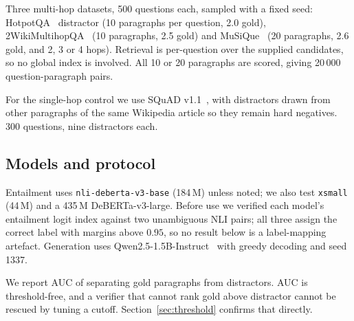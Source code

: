 \documentclass[conference]{IEEEtran}
\begin{document}
Three multi-hop datasets, 500 questions each, sampled with a fixed seed:
HotpotQA~\cite{yang2018hotpotqa} distractor (10 paragraphs per question, 2.0
gold), 2WikiMultihopQA~\cite{ho20202wiki} (10 paragraphs, 2.5 gold) and
MuSiQue~\cite{trivedi2022musique} (20 paragraphs, 2.6 gold, and 2, 3 or 4 hops).
Retrieval is per-question over the supplied candidates, so no global index is
involved. All 10 or 20 paragraphs are scored, giving 20\,000
question-paragraph pairs.

For the single-hop control we use SQuAD v1.1~\cite{rajpurkar2016squad}, with
distractors drawn from other paragraphs of the same Wikipedia article so they
remain hard negatives. 300 questions, nine distractors each.

\subsection{Models and protocol}

Entailment uses \texttt{nli-deberta-v3-base} (184\,M) unless noted; we also test
\texttt{xsmall} (44\,M) and a 435\,M DeBERTa-v3-large. Before use we verified
each model's entailment logit index against two unambiguous NLI pairs; all three
assign the correct label with margins above $0.95$, so no result below is a
label-mapping artefact. Generation uses Qwen2.5-1.5B-Instruct~\cite{yang2024qwen}
with greedy decoding and seed 1337.

We report AUC of separating gold paragraphs from distractors. AUC is
threshold-free, and a verifier that cannot rank gold above distractor cannot be
rescued by tuning a cutoff. Section~\ref{sec:threshold} confirms that directly.
\end{document}
